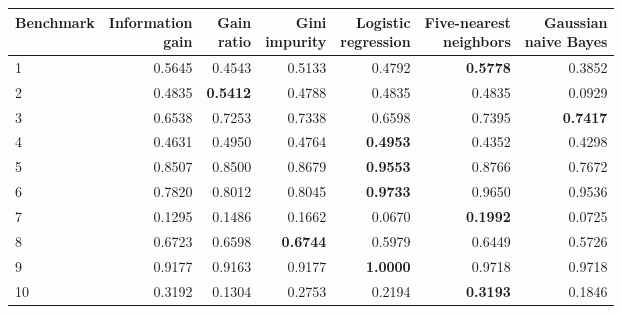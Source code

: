 \begin{tabular}{@{}lrrrrrr@{}}
\toprule
Benchmark & \shortstack{Information\\gain} & \shortstack{Gain\\ratio} & \shortstack{Gini\\impurity} & \shortstack{Logistic\\regression} & \shortstack{Five-nearest\\neighbors} & \shortstack{Gaussian\\naive Bayes} \\
\midrule
1 & 0.5645 & 0.4543 & 0.5133 & 0.4792 & \textbf{0.5778} & 0.3852 \\
2 & 0.4835 & \textbf{0.5412} & 0.4788 & 0.4835 & 0.4835 & 0.0929 \\
3 & 0.6538 & 0.7253 & 0.7338 & 0.6598 & 0.7395 & \textbf{0.7417} \\
4 & 0.4631 & 0.4950 & 0.4764 & \textbf{0.4953} & 0.4352 & 0.4298 \\
5 & 0.8507 & 0.8500 & 0.8679 & \textbf{0.9553} & 0.8766 & 0.7672 \\
6 & 0.7820 & 0.8012 & 0.8045 & \textbf{0.9733} & 0.9650 & 0.9536 \\
7 & 0.1295 & 0.1486 & 0.1662 & 0.0670 & \textbf{0.1992} & 0.0725 \\
8 & 0.6723 & 0.6598 & \textbf{0.6744} & 0.5979 & 0.6449 & 0.5726 \\
9 & 0.9177 & 0.9163 & 0.9177 & \textbf{1.0000} & 0.9718 & 0.9718 \\
10 & 0.3192 & 0.1304 & 0.2753 & 0.2194 & \textbf{0.3193} & 0.1846 \\
\bottomrule
\end{tabular}
